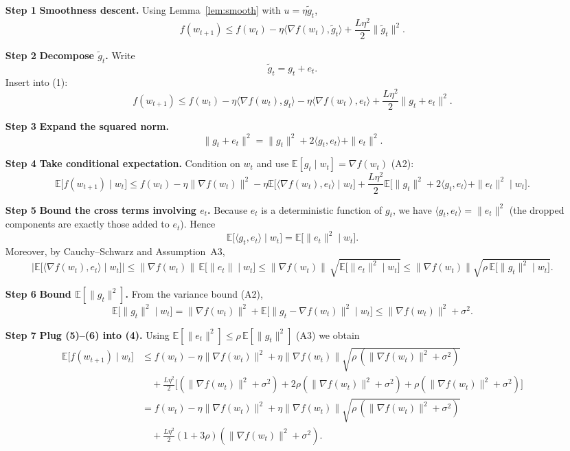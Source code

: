 \documentclass{article}
\newcommand{\EE}{\mathbb{E}}
\begin{document}
\begin{enumerate}
\item[{\bf Step 1}] \textbf{Smoothness descent.}  
Using Lemma~\ref{lem:smooth} with $u=\eta\tilde g_t$,
\[
f(w_{t+1})\le f(w_t)-\eta\langle\nabla f(w_t),\tilde g_t\rangle
+\frac{L\eta^2}{2}\|\tilde g_t\|^2 .\tag{1}
\]

\item[{\bf Step 2}] \textbf{Decompose $\tilde g_t$.}  
Write
\[
\tilde g_t = g_t + e_t .
\]
Insert into (1):
\[
f(w_{t+1})\le f(w_t)-\eta\langle\nabla f(w_t),g_t\rangle
-\eta\langle\nabla f(w_t),e_t\rangle
+\frac{L\eta^2}{2}\|g_t+e_t\|^2 .\tag{2}
\]

\item[{\bf Step 3}] \textbf{Expand the squared norm.}
\[
\|g_t+e_t\|^2 = \|g_t\|^2+2\langle g_t,e_t\rangle+\|e_t\|^2 .\tag{3}
\]

\item[{\bf Step 4}] \textbf{Take conditional expectation.}  
Condition on $w_t$ and use $\EE[g_t\mid w_t]=\nabla f(w_t)$ (A2):
\[
\EE\!\big[f(w_{t+1})\mid w_t\big]\le
f(w_t)-\eta\|\nabla f(w_t)\|^2
-\eta\EE\!\big[\langle\nabla f(w_t),e_t\rangle\mid w_t\big]
+\frac{L\eta^2}{2}\EE\!\big[\|g_t\|^2+2\langle g_t,e_t\rangle+\|e_t\|^2\mid w_t\big].\tag{4}
\]

\item[{\bf Step 5}] \textbf{Bound the cross terms involving $e_t$.}  
Because $e_t$ is a deterministic function of $g_t$, we have
$\langle g_t,e_t\rangle=\|e_t\|^2$ (the dropped components are exactly those
added to $e_t$).  Hence
\[
\EE\!\big[\langle g_t,e_t\rangle\mid w_t\big]=\EE\!\big[\|e_t\|^2\mid w_t\big].
\]
Moreover, by Cauchy–Schwarz and Assumption~A3,
\[
\big|\EE\!\big[\langle\nabla f(w_t),e_t\rangle\mid w_t\big]\big|
\le\|\nabla f(w_t)\|\,
\EE\!\big[\|e_t\|\mid w_t\big]
\le\|\nabla f(w_t)\|\,
\sqrt{\EE\!\big[\|e_t\|^2\mid w_t\big]}
\le\|\nabla f(w_t)\|\sqrt{\rho\,\EE\!\big[\|g_t\|^2\mid w_t\big]} .
\tag{5}
\]

\item[{\bf Step 6}] \textbf{Bound $\EE[\|g_t\|^2]$.}  
From the variance bound (A2),
\[
\EE\!\big[\|g_t\|^2\mid w_t\big]
= \|\nabla f(w_t)\|^2 + \EE\!\big[\|g_t-\nabla f(w_t)\|^2\mid w_t\big]
\le \|\nabla f(w_t)\|^2+\sigma^2 .\tag{6}
\]

\item[{\bf Step 7}] \textbf{Plug (5)–(6) into (4).}  
Using $\EE[\|e_t\|^2]\le\rho\,\EE[\|g_t\|^2]$ (A3) we obtain
\[
\begin{aligned}
\EE\!\big[f(w_{t+1})\mid w_t\big]
&\le f(w_t)-\eta\|\nabla f(w_t)\|^2
+ \eta\|\nabla f(w_t)\|\sqrt{\rho\,(\|\nabla f(w_t)\|^2+\sigma^2)}\\
&\quad+\frac{L\eta^2}{2}\Big[(\|\nabla f(w_t)\|^2+\sigma^2)
+2\rho(\|\nabla f(w_t)\|^2+\sigma^2)
+\rho(\|\nabla f(w_t)\|^2+\sigma^2)\Big]\\
&= f(w_t)-\eta\|\nabla f(w_t)\|^2
+ \eta\|\nabla f(w_t)\|\sqrt{\rho\,(\|\nabla f(w_t)\|^2+\sigma^2)}\\
&\quad+\frac{L\eta^2}{2}(1+3\rho)(\|\nabla f(w_t)\|^2+\sigma^2).
\end{aligned}\tag{7}
\]


\end{enumerate}
\end{document}
